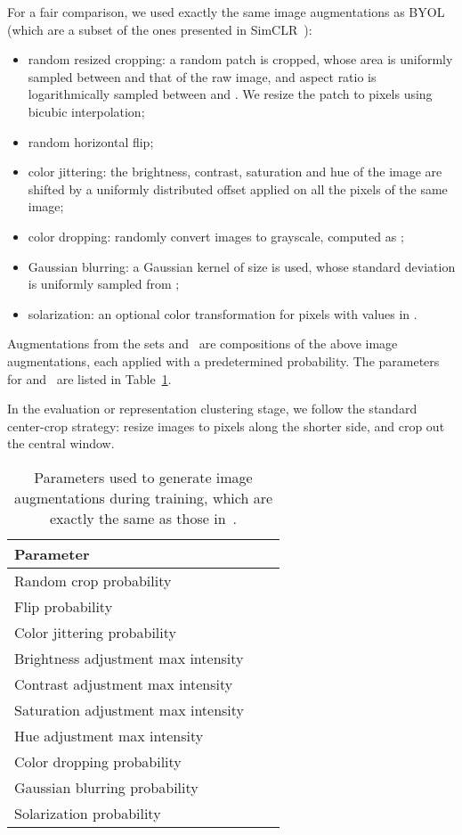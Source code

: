 \documentclass[final]{cvpr}
\begin{document}
For a fair comparison, we used exactly the same image augmentations as BYOL~\cite{grill2020bootstrap} (which are a subset of the ones presented in SimCLR~\cite{chen2020simple}):
\begin{itemize}
    \item random resized cropping: a random patch is cropped, whose area is uniformly sampled between  and  that of the raw image, and aspect ratio is logarithmically sampled between  and . We resize the patch to  pixels using bicubic interpolation;
    \item random horizontal flip;
    \item color jittering: the brightness, contrast, saturation and hue of the image are shifted by a uniformly distributed offset applied on all the pixels of the same image;
    \item color dropping: randomly convert images to grayscale, computed as ;
    
    \item Gaussian blurring: a Gaussian kernel of size  is used, whose standard deviation is uniformly sampled from ;
    \item solarization: an optional color transformation  for pixels with values in .
\end{itemize}

Augmentations from the sets  and~ are compositions of the above image augmentations, each applied with a predetermined probability. The parameters for  and~ are listed in Table~\ref{tab:transformation_distributions}.

In the evaluation or representation clustering stage, we follow the standard center-crop strategy: resize images to  pixels along the shorter side, and crop out the central  window.

\begin{table}[ht]
    \small
    \centering
    \begin{tabular}{l l l} \toprule
        Parameter &  &  \\ \midrule
        Random crop probability &  &  \\
        Flip probability &  &  \\
        Color jittering probability &  &  \\
        Brightness adjustment max intensity &  &  \\
        Contrast adjustment max intensity &  &  \\
        Saturation adjustment max intensity &  &  \\
        Hue adjustment max intensity &  &  \\
        Color dropping probability &  &  \\
        Gaussian blurring probability &  &  \\
        Solarization probability &  &  \\ \bottomrule
    \end{tabular}
     \vspace{0.5em}
    \caption{Parameters used to generate image augmentations during training, which are exactly the same as those in~\cite{grill2020bootstrap}.}
    \label{tab:transformation_distributions}
\end{table}
\end{document}
